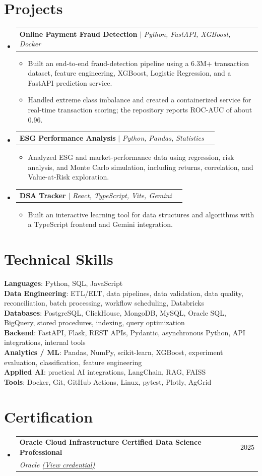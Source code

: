 \documentclass[letterpaper,10pt]{article}
\makeatletter
\newcommand{\resumeItem}[1]{\item\small{{#1 \vspace{-2pt}}}}
\newcommand{\resumeSubheading}[4]{
  \vspace{-2pt}\item
  \begin{tabular*}{0.97\textwidth}[t]{l@{\extracolsep{\fill}}r}
    \textbf{#1} & #2 \\
    \textit{\small#3} & \textit{\small #4} \\
  \end{tabular*}\vspace{-7pt}
}
\newcommand{\resumeProjectHeading}[2]{
  \item
  \begin{tabular*}{0.97\textwidth}{l@{\extracolsep{\fill}}r}
    \small#1 & #2 \\
  \end{tabular*}\vspace{-7pt}
}
\newcommand{\resumeSubHeadingListStart}{\begin{itemize}[leftmargin=0.15in, label={}]}
\newcommand{\resumeSubHeadingListEnd}{\end{itemize}}
\newcommand{\resumeItemListStart}{\begin{itemize}[leftmargin=0.18in]}
\newcommand{\resumeItemListEnd}{\end{itemize}\vspace{-5pt}}
\makeatother
\begin{document}
\section{Projects}
\resumeSubHeadingListStart
  \resumeProjectHeading
    {\textbf{Online Payment Fraud Detection} $|$ \emph{Python, FastAPI, XGBoost, Docker}}{}
    \resumeItemListStart
      \resumeItem{Built an end-to-end fraud-detection pipeline using a 6.3M+ transaction dataset, feature engineering, XGBoost, Logistic Regression, and a FastAPI prediction service.}
      \resumeItem{Handled extreme class imbalance and created a containerized service for real-time transaction scoring; the repository reports ROC-AUC of about 0.96.}
    \resumeItemListEnd
  \resumeProjectHeading
    {\textbf{ESG Performance Analysis} $|$ \emph{Python, Pandas, Statistics}}{}
    \resumeItemListStart
      \resumeItem{Analyzed ESG and market-performance data using regression, risk analysis, and Monte Carlo simulation, including returns, correlation, and Value-at-Risk exploration.}
    \resumeItemListEnd
  \resumeProjectHeading
    {\textbf{DSA Tracker} $|$ \emph{React, TypeScript, Vite, Gemini}}{}
    \resumeItemListStart
      \resumeItem{Built an interactive learning tool for data structures and algorithms with a TypeScript frontend and Gemini integration.}
    \resumeItemListEnd
\resumeSubHeadingListEnd

\section{Technical Skills}
\begin{itemize}[leftmargin=0.15in, label={}]
  \small{\item{
    \textbf{Languages}{: Python, SQL, JavaScript} \\
    \textbf{Data Engineering}{: ETL/ELT, data pipelines, data validation, data quality, reconciliation, batch processing, workflow scheduling, Databricks} \\
    \textbf{Databases}{: PostgreSQL, ClickHouse, MongoDB, MySQL, Oracle SQL, BigQuery, stored procedures, indexing, query optimization} \\
    \textbf{Backend}{: FastAPI, Flask, REST APIs, Pydantic, asynchronous Python, API integrations, internal tools} \\
    \textbf{Analytics / ML}{: Pandas, NumPy, scikit-learn, XGBoost, experiment evaluation, classification, feature engineering} \\
    \textbf{Applied AI}{: practical AI integrations, LangChain, RAG, FAISS} \\
    \textbf{Tools}{: Docker, Git, GitHub Actions, Linux, pytest, Plotly, AgGrid}
  }}
\end{itemize}

\section{Certification}
\resumeSubHeadingListStart
  \resumeSubheading
    {Oracle Cloud Infrastructure Certified Data Science Professional}{2025}
    {Oracle \href{https://catalog-education.oracle.com/pls/certview/sharebadge?id=EE9ED7F5A3D94EC9D9B9FFA9C4A1E3D60EDB0D53FCA28F4CE25E03A76A82C0C5}{\underline{(View credential)}}}{ }
\resumeSubHeadingListEnd
\end{document}

